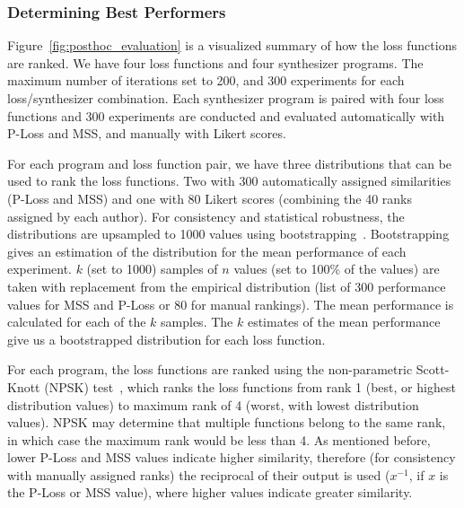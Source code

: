 \documentclass[lettersize,journal]{IEEEtran}
\providecommand{\gls}[1]{#1}
\begin{document}
\subsubsection{Determining Best Performers}
 Figure~\ref{fig:posthoc_evaluation} is a visualized summary of how the loss functions are ranked. We have four loss functions and four synthesizer programs. The maximum number of iterations set to 200, and 300 experiments for each loss/synthesizer combination. Each synthesizer program is paired with four loss functions and 300 experiments are conducted and evaluated automatically with P-Loss and MSS, and manually with Likert scores.

For each program and loss function pair, we have three distributions that can be used to rank the loss functions. Two with 300 automatically assigned similarities (P-Loss and MSS) and one with 80 Likert scores (combining the 40 ranks assigned by each author). For consistency and statistical robustness, the distributions are upsampled to 1000 values using bootstrapping~\cite{tibshirani1993introduction}. Bootstrapping gives an estimation of the distribution for the mean performance of each experiment. $k$ (set to 1000) samples of $n$ values (set to 100\% of the values) are taken with replacement from the empirical distribution (list of 300 performance values for MSS and P-Loss or 80 for manual rankings). The mean performance is calculated for each of the $k$ samples. The $k$ estimates of the mean performance give us a bootstrapped distribution for each loss function. 

For each program, the loss functions are ranked using the non-parametric Scott-Knott (\gls{NPSK}) test~\cite{tantithamthavorn2017mvt,tantithamthavorn2018optimization}, which ranks the loss functions from rank 1 (best, or highest distribution values) to maximum rank of 4 (worst, with lowest distribution values). NPSK may determine that multiple functions belong to the same rank, in which case the maximum rank would be less than 4. As mentioned before, lower P-Loss and MSS values indicate higher similarity, therefore (for consistency with manually assigned ranks) the reciprocal of their output is used ($x^{-1}$, if $x$ is the P-Loss or MSS value), where higher values indicate greater similarity. 


\end{document}
